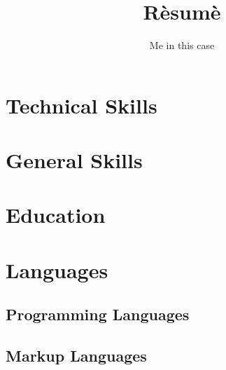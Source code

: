 \documentclass {article}
\begin{document}
\title {R\`esum\`e}
\author {Me in this case}

\maketitle {}


\section {Technical Skills}

\section {General Skills}

\section {Education}

\section {Languages}

\subsection {Programming Languages}

\subsection {Markup Languages}
\end{document}
